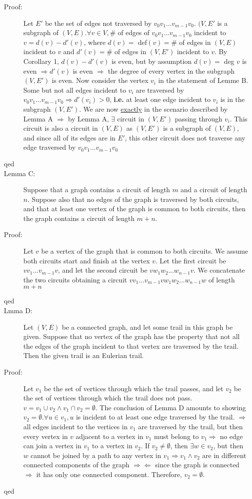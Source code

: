 \documentclass[10pt]{article}
\begin{document}
\begin{description}
		\item[Proof:] Let $E'$ be the set of edges not traversed by $v_0 v_1 ... v_{m-1} v_0$. $(V, E'$ is a subgraph of $(V, E). \forall v \in V, \#$ of edges of $v_0 v_1 ... v_{m-1} v_0$ incident to $v = d(v) - d'(v)$, where $d(v) =$ def$(v) = \#$ of edges in $(V, E)$ incident to $v$ and $d'(v) = \#$ of edges in $(V, E')$ incident to $v$. By Corollary 1, $d(v) - d'(v)$ is even, but by assumption $d(v) =$ deg $v$ is even $\Rightarrow d'(v)$ is even $\Rightarrow$ the degree of every vertex in the subgraph $(V, E')$ is even. Now consider the vertex $v_i$ in the statement of Lemme B. Some but not all edges incident to $v_i$ are traversed by $v_0 v_1 ... v_{m-1} v_0 \Rightarrow d'(v_i) > 0$, \textbf{i.e.} at least one edge incident to $v_i$ is in the subgraph $(V, E')$. We are now \underline{exactly} in the scenario described by Lemma A $\Rightarrow$ by Lemma A, $\exists$ circuit in $(V, E')$   passing through $v_i$. This circuit is also a circuit in $(V, E)$ as $(V, E')$ is a subgraph of $(V, E)$, and since all of its edges are in $E'$, this other circuit does not traverse any edge traversed by $v_0 v_1 ... v_{m-1} v_0$
		\item[qed]
		\item[Lemma C:] Suppose that a graph contains a circuit of length $m$ and a circuit of length $n$. Suppose also that no edges of the graph is traversed by both circuits, and that at least one vertex of the graph is common to both circuits, then the graph contains a circuit of length $m+n$.
		\item[Proof:] Let $v$ be a vertex of the graph that is common to both circuits. We assume both circuits start and finish at the vertex $v$. Let the first circuit be $vv_1 ... v_{m-1} v$, and let the second circuit be $vw_1 w_2 ... w_{n-1} v$. We concatenate the two circuits obtaining a circuit $vv_1...v_{m-1}vw_1w_2...w_{n-1}w$ of length $m+n$
		\item[qed]
		\item[Lmma D:] Let $(V, E)$ be a connected graph, and let some trail in this graph be given. Suppose that no vertex of the graph has the property that not all the edges of the graph incident to that vertex are traversed by the trail. Then the given trail is an Eulerian trail.
		\item[Proof:] Let $v_1$ be the set of vertices through which the trail passes, and let $v_2$ be the set of vertices through which the trail does not pass. $v=v_1 \cup v_2 \land v_1 \cap v_2 = \emptyset$. The conclusion of Lemma D amounts to showing $v_2 = \emptyset. \forall u \in v_1, u$ is incident to at least one edge traversed by the trail. $\Rightarrow$ all edges incident to the vertices in $v_1$ are traversed by the trail, but then every vertex in $v$ adjacent to a vertex in $v_1$ must belong to $v_1 \Rightarrow$ no edge can join a vertex in $v_1$ to a vertex in $v_2$. If $v_2 \neq \emptyset$, then $\exists w \in v_2$, but then $w$ cannot be joined by a path to any vertex in $v_1 \Rightarrow v_1 \land v_2$ are in different connected components of the graph $\Rightarrow \Leftarrow$ since the graph is connected $\Rightarrow$ it has only one connected component. Therefore, $v_2 = \emptyset$.
		\item[qed]
	\end{description}
\end{document}
